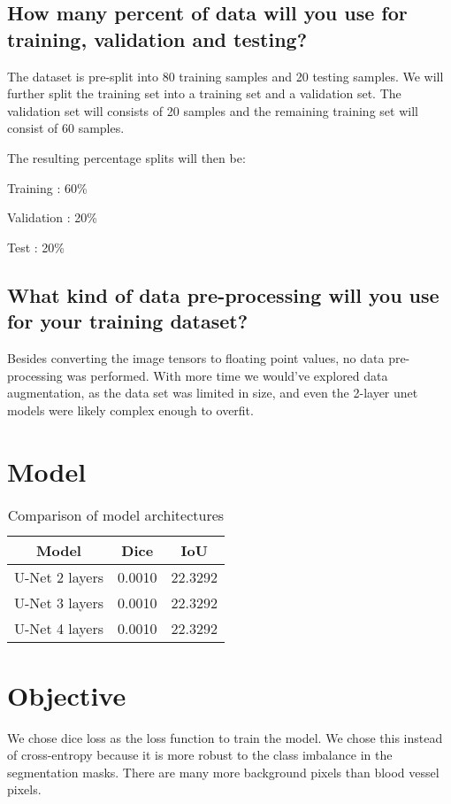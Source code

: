 \documentclass{article}
\begin{document}
\subsection{How many percent of data will you use for training, validation and testing?}
The dataset is pre-split into 80 training samples and 20 testing samples. We will
further split the training set into a training set and a validation set. The validation
set will consists of 20 samples and the remaining training set will consist of 60 samples.

The resulting percentage splits will then be:
\begin{description}
    \item Training : 60\%
    \item Validation : 20\%
    \item Test : 20\%
\end{description}

\subsection{What kind of data pre-processing will you use for your training dataset?}
Besides converting the image tensors to floating point values, no data pre-processing
was performed. With more time we would've explored data augmentation, as the data set
was limited in size, and even the 2-layer unet models were likely complex enough to
overfit.


\section{Model}

\begin{table}[h]
\begin{center}
\begin{tabular}{c|c|c}
    Model & Dice & IoU \\
    \hline
    U-Net 2 layers & 0.0010 & 22.3292 \\
    U-Net 3 layers & 0.0010 & 22.3292 \\
    U-Net 4 layers & 0.0010 & 22.3292
\end{tabular}
\end{center}
\caption{Comparison of model architectures}
\label{table:models}
\end{table}

\section{Objective}
We chose dice loss as the loss function to train the model. We chose
this instead of cross-entropy because it is more robust to the class
imbalance in the segmentation masks. There are many more background
pixels than blood vessel pixels.
\end{document}
